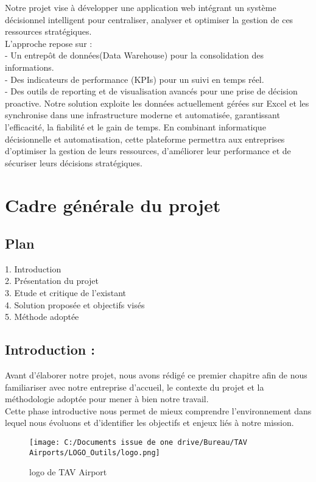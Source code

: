\documentclass[a4paper,11pt]{report}
\begin{document}
Notre projet vise à développer une application web intégrant un système décisionnel intelligent pour centraliser, analyser et optimiser la gestion de ces ressources stratégiques.\\
L'approche repose sur :\\
  	 - Un entrepôt de données(Data Warehouse) pour la consolidation des informations.\\
  	 - Des indicateurs de performance (KPIs) pour un suivi en temps réel.\\
  	 - Des outils de reporting et de visualisation avancés pour une prise de décision proactive. 
\vspace{0.2cm}
\newline
Notre solution exploite les données actuellement gérées sur Excel et les synchronise dans une infrastructure moderne et automatisée, garantissant l'efficacité, la fiabilité et le gain de temps.
\vspace{0.2cm}
\newline
En combinant informatique décisionnelle et automatisation, cette plateforme permettra aux entreprises d'optimiser la gestion de leurs ressources, d'améliorer leur performance et de sécuriser leurs décisions stratégiques.
\newpage
\chapter{Cadre générale du projet }
\section*{Plan}

1. Introduction  \\
2. Présentation du projet\\
3. Etude et critique de l'existant\\
4. Solution proposée et objectifs visés \\
5. Méthode adoptée
\newpage 
\section{Introduction : }
Avant d'élaborer notre projet, nous avons rédigé ce premier chapitre afin de nous familiariser avec notre entreprise d'accueil, le contexte du projet et la méthodologie adoptée pour mener à bien notre travail.\\
Cette phase introductive nous permet de mieux comprendre l'environnement dans lequel nous évoluons et d'identifier les objectifs et enjeux liés à notre mission.
\begin{figure}[H]
\centering
\texttt{[image: C:/Documents issue de one drive/Bureau/TAV Airports/LOGO\_Outils/logo.png]}
\caption{logo de TAV Airport}
\end{figure}
\end{document}
